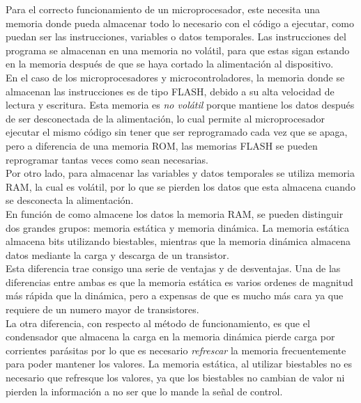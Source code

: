 \documentclass[spanish]{template/minim}
\begin{document}
Para el correcto funcionamiento de un microprocesador, este necesita una memoria donde pueda almacenar todo lo necesario con el código a ejecutar, como puedan ser las instrucciones, variables o datos temporales. Las instrucciones del programa se almacenan en una memoria no volátil, para que estas sigan estando en la memoria después de que se haya cortado la alimentación al dispositivo.\\

En el caso de los microprocesadores y microcontroladores, la memoria donde se almacenan las instrucciones es de tipo FLASH, debido a su alta velocidad de lectura y escritura. Esta memoria es \textit{no volátil} porque mantiene los datos después de ser desconectada de la alimentación, lo cual permite al microprocesador ejecutar el mismo código sin tener que ser reprogramado cada vez que se apaga, pero a diferencia de una memoria ROM, las memorias FLASH se pueden reprogramar tantas veces como sean necesarias.\\

Por otro lado, para almacenar las variables y datos temporales se utiliza memoria RAM, la cual es volátil, por lo que se pierden los datos que esta almacena cuando se desconecta la alimentación.\\

En función de como almacene los datos la memoria RAM, se pueden distinguir dos grandes grupos: memoria {\color{accent}estática} y memoria {\color{accent}dinámica}. La memoria estática almacena bits utilizando biestables, mientras que la memoria dinámica almacena datos mediante la carga y descarga de un transistor.\\

Esta diferencia trae consigo una serie de ventajas y de desventajas. Una de las diferencias entre ambas es que la memoria estática es varios ordenes de magnitud más rápida que la dinámica, pero a expensas de que es mucho más cara ya que requiere de un numero mayor de transistores.\\

La otra diferencia, con respecto al método de funcionamiento, es que el condensador que almacena la carga en la memoria dinámica pierde carga por corrientes parásitas por lo que es necesario \textit{refrescar} la memoria frecuentemente para poder mantener los valores. La memoria estática, al utilizar biestables no es necesario que refresque los valores, ya que los biestables no cambian de valor ni pierden la información a no ser que lo mande la señal de control.\\
\end{document}
